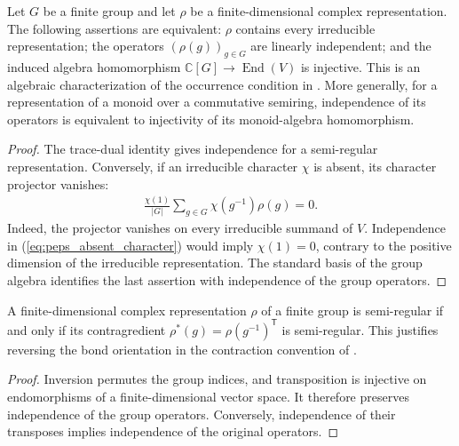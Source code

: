 \begin{lemma}
    \label{thm:peps_semiregular_group_algebra}
    \leanok
    Let $G$ be a finite group and let $\rho$ be a finite-dimensional complex
    representation. The following assertions are equivalent:
    $\rho$ contains every irreducible representation; the operators
    $(\rho(g))_{g\in G}$ are linearly independent; and the induced algebra
    homomorphism $\mathbb C[G]\to\operatorname{End}(V)$ is injective.
    This is an algebraic characterization of the occurrence condition in
    \cite[Definition~4.5 and Lemma~4.6]{Schuch2010PEPS}.
    More generally, for a representation of a monoid over a commutative
    semiring, independence of its operators is equivalent to injectivity
    of its monoid-algebra homomorphism.
\end{lemma}
\begin{proof}\leanok
    The trace-dual identity gives independence for a semi-regular
    representation. Conversely, if an irreducible character $\chi$ is
    absent, its character projector vanishes:
    \begin{align}
        \frac{\chi(1)}{|G|}\sum_{g\in G}\chi(g^{-1})\rho(g)=0.
        \label{eq:peps_absent_character}
    \end{align}
    Indeed, the projector vanishes on every irreducible summand of $V$.
    Independence in (\ref{eq:peps_absent_character}) would imply
    $\chi(1)=0$, contrary to the positive dimension of the irreducible
    representation. The standard basis of the group algebra identifies
    the last assertion with independence of the group operators.
\end{proof}

\begin{lemma}
    \label{thm:peps_semiregular_dual}
    \leanok
    A finite-dimensional complex representation $\rho$ of a finite group
    is semi-regular if and only if its contragredient
    $\rho^*(g)=\rho(g^{-1})^{\mathsf T}$ is semi-regular.
    This justifies reversing the bond orientation in the contraction
    convention of \cite[Definition~5.1 and Lemma~5.2]{Schuch2010PEPS}.
\end{lemma}
\begin{proof}\leanok
    Inversion permutes the group indices, and transposition is injective
    on endomorphisms of a finite-dimensional vector space. It therefore
    preserves independence of the group operators. Conversely,
    independence of their transposes implies independence of the
    original operators.
\end{proof}

